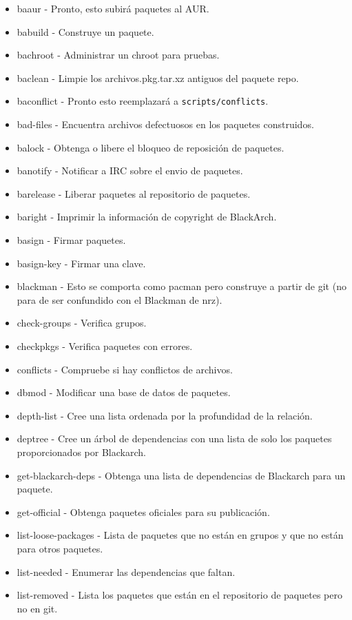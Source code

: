 \documentclass[a4paper, oneside, 11pt]{book}
\begin{document}
\begin{itemize}
\item baaur -  Pronto, esto subir\'a paquetes al AUR.
\item babuild - Construye un paquete.
\item bachroot - Administrar un chroot para pruebas.
\item baclean - Limpie los archivos.pkg.tar.xz antiguos del paquete repo.
\item baconflict - Pronto esto reemplazar\'a a \verb|scripts/conflicts|.
\item bad-files - Encuentra archivos defectuosos en los paquetes construidos.
\item balock - Obtenga o libere el bloqueo de reposici\'on de paquetes.
\item banotify - Notificar a IRC sobre el envio de paquetes.
\item barelease - Liberar paquetes al repositorio de paquetes.
\item baright - Imprimir la informaci\'on de copyright de BlackArch.
\item basign -  Firmar paquetes.
\item basign-key - Firmar una clave.
\item blackman - Esto se comporta como pacman pero construye a partir de git (no para de ser
    confundido con el Blackman de nrz).
\item check-groups - Verifica grupos.
\item checkpkgs - Verifica paquetes con errores.
\item conflicts - Compruebe si hay conflictos de archivos.
\item dbmod - Modificar una base de datos de paquetes.
\item depth-list - Cree una lista ordenada por la profundidad de la relaci\'on.
\item deptree - Cree un \'arbol de dependencias con una lista de solo los paquetes proporcionados por Blackarch.
\item get-blackarch-deps - Obtenga una lista de dependencias de Blackarch para un paquete.
\item get-official - Obtenga paquetes oficiales para su publicaci\'on.
\item list-loose-packages - Lista de paquetes que no est\'an en grupos y que no est\'an
    para otros paquetes.
\item list-needed - Enumerar las dependencias que faltan.
\item list-removed - Lista los paquetes que est\'an en el repositorio de paquetes pero no en git.

\end{itemize}
\end{document}
